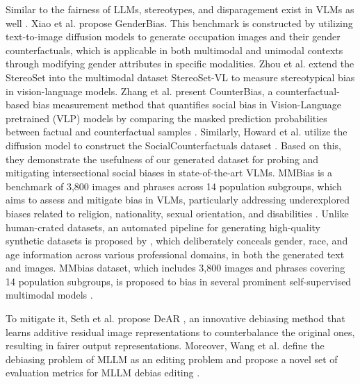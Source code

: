 Similar to the fairness of LLMs, stereotypes, and disparagement exist in VLMs as well \cite{ananthram2024see, xiao2024genderbias, zhou2022vlstereoset, 10.1145/3503161.3548396, Seth_2023_CVPR, janghorbani2023multimodal, 10377223, wu2024evaluating, fraser2024examining, ruggeri-nozza-2023-multi, abbas2023semdedup, Slyman_2024_CVPR}. Xiao et al. \cite{xiao2024genderbias} propose GenderBias. This benchmark is constructed by utilizing text-to-image diffusion models to generate occupation images and their gender counterfactuals, which is applicable in both multimodal and unimodal contexts through modifying gender attributes in specific modalities. Zhou et al. extend the StereoSet \cite{stereoset} into the multimodal dataset StereoSet-VL \cite{zhou2022vlstereoset} to measure stereotypical bias in vision-language models. Zhang et al. present CounterBias, a counterfactual-based bias measurement method that quantifies social bias in Vision-Language pretrained (VLP) models by comparing the masked prediction probabilities between factual and counterfactual samples \cite{10.1145/3503161.3548396}. Similarly, Howard et al. utilize the diffusion model to construct the SocialCounterfactuals dataset \cite{Howard_2024_CVPR}. Based on this, they demonstrate the usefulness of our generated dataset for probing and mitigating intersectional social biases in state-of-the-art VLMs. MMBias is a benchmark of 3,800 images and phrases across 14 population subgroups, which aims to assess and mitigate bias in VLMs, particularly addressing underexplored biases related to religion, nationality, sexual orientation, and disabilities \cite{janghorbani2023multimodal}. Unlike human-crated datasets, an automated pipeline for generating high-quality synthetic datasets is proposed by \cite{sathe2024unified}, which deliberately conceals gender, race, and age information across various professional domains, in both the generated text and images. MMbias dataset, which includes 3,800 images and phrases covering 14 population subgroups, is proposed to bias in several prominent self-supervised multimodal models \cite{janghorbani-de-melo-2023-multi}.

To mitigate it, Seth et al. propose DeAR \cite{Seth_2023_CVPR}, an innovative debiasing method that learns additive residual image representations to counterbalance the original ones, resulting in fairer output representations. Moreover, Wang et al. define the debiasing problem of MLLM as an editing problem and propose a novel set of evaluation metrics for MLLM debias editing \cite{wang2024can}.



